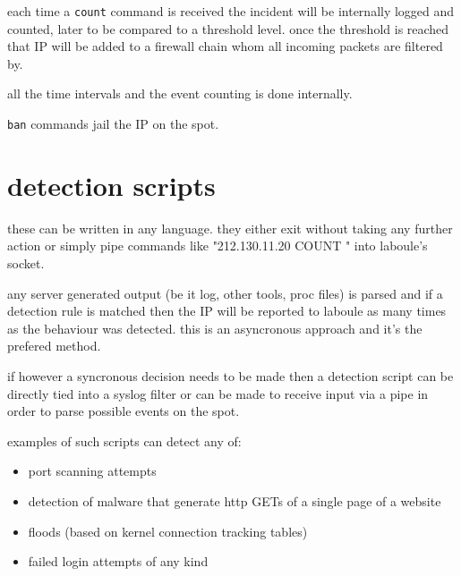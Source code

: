 \documentclass[12pt,twoside,a4paper,titlepage]{report}
\begin{document}
each time a \verb!count! command is received the incident will be internally logged and counted, later to be compared to a threshold level. once the threshold is reached that IP will be added to a firewall chain whom all incoming packets are filtered by.

all the time intervals and the event counting is done internally.

\verb!ban! commands jail the IP on the spot.

\section{detection scripts}

these can be written in any language. they either exit without taking any further action or simply pipe commands like "212.130.11.20 COUNT " into laboule's socket.

any server generated output (be it log, other tools, proc files) is parsed and if a detection rule is matched then the IP will be reported to laboule as many times as the behaviour was detected. this is an asyncronous approach and it's the prefered method.

if however a syncronous decision needs to be made then a detection script can be directly tied into a syslog filter or can be made to receive input via a pipe in order to parse possible events on the spot.

examples of such scripts can detect any of: 
\begin{itemize}
    \item port scanning attempts
    \item detection of malware that generate http GETs of a single page of a website
    \item floods (based on kernel connection tracking tables)
    \item failed login attempts of any kind
\end{itemize}
\end{document}
